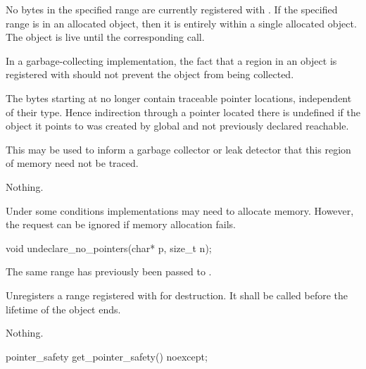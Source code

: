 \begin{itemdescr}
\pnum
\expects
No bytes in the specified range are currently registered with
. If the specified range is in an allocated object,
then it is entirely within a single allocated object. The object is
live until the corresponding  call.
\begin{note}
In a garbage-collecting implementation, the fact that a region in an object is
registered with  should not prevent the object from
being collected.
\end{note}

\pnum
\effects
The  bytes starting at  no longer contain
traceable pointer locations, independent of their type. Hence
indirection through a pointer located there is undefined if the object
it points to was created by global  and not
previously declared reachable.
\begin{note}
This may be used to inform a
garbage collector or leak detector that this region of memory need not
be traced.
\end{note}

\pnum
\throws
Nothing.

\pnum
\begin{note}
Under some conditions implementations may need to allocate memory.
However, the request can be ignored if memory allocation fails.
\end{note}
\end{itemdescr}

%
\begin{itemdecl}
void undeclare_no_pointers(char* p, size_t n);
\end{itemdecl}

\begin{itemdescr}
\pnum
\expects
The same range has previously been passed to .

\pnum
\effects
Unregisters a range registered with  for
destruction. It shall be called before the lifetime of the object ends.

\pnum
\throws
Nothing.
\end{itemdescr}

%
\begin{itemdecl}
pointer_safety get_pointer_safety() noexcept;
\end{itemdecl}

